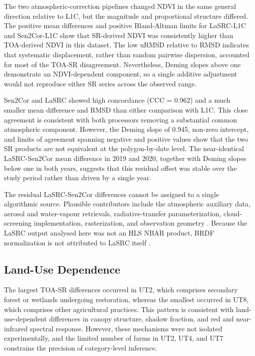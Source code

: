 \documentclass[
  authoryear,
  preprint]{elsarticle}
\begin{document}
The two atmospheric-correction pipelines changed NDVI in the same
general direction relative to L1C, but the magnitude and proportional
structure differed. The positive mean differences and positive
Bland-Altman limits for LaSRC-L1C and Sen2Cor-L1C show that SR-derived
NDVI was consistently higher than TOA-derived NDVI in this dataset. The
low uRMSD relative to RMSD indicates that systematic displacement,
rather than random pairwise dispersion, accounted for most of the TOA-SR
disagreement. Nevertheless, Deming slopes above one demonstrate an
NDVI-dependent component, so a single additive adjustment would not
reproduce either SR series across the observed range.

Sen2Cor and LaSRC showed high concordance (CCC = 0.962) and a much
smaller mean difference and RMSD than either comparison with L1C. This
close agreement is consistent with both processors removing a
substantial common atmospheric component. However, the Deming slope of
0.945, non-zero intercept, and limits of agreement spanning negative and
positive values show that the two SR products are not equivalent at the
polygon-by-date level. The near-identical LaSRC-Sen2Cor mean difference
in 2019 and 2020, together with Deming slopes below one in both years,
suggests that this residual offset was stable over the study period
rather than driven by a single year.

The residual LaSRC-Sen2Cor differences cannot be assigned to a single
algorithmic source. Plausible contributors include the atmospheric
auxiliary data, aerosol and water-vapour retrievals, radiative-transfer
parameterization, cloud-screening implementation, rasterization, and
observation geometry \citep{MainKnorn2017, Vermote2016, Vermote2018}.
Because the LaSRC output analysed here was not an HLS NBAR product, BRDF
normalization is not attributed to LaSRC itself
\citep{Franch2019, USGSHLS2024}.

\subsection{Land-Use Dependence}\label{sec-disc-gradiente}

The largest TOA-SR differences occurred in UT2, which comprises
secondary forest or wetlands undergoing restoration, whereas the
smallest occurred in UT8, which comprises other agricultural practices.
This pattern is consistent with land-use-dependent differences in canopy
structure, shadow fraction, and red and near-infrared spectral response.
However, these mechanisms were not isolated experimentally, and the
limited number of farms in UT2, UT4, and UT7 constrains the precision of
category-level inference.
\end{document}
